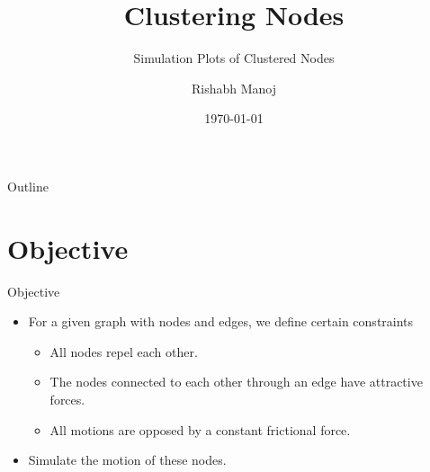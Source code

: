 \documentclass{beamer}
\title{Clustering Nodes}
\subtitle{Simulation Plots of Clustered Nodes}
\author{Rishabh Manoj}
\institute{International Institute of Information Technology Bangalore}
\date{\today}
\begin{document}
\begin{frame}
  \titlepage
\end{frame}

\begin{frame}{Outline}
  \tableofcontents
\end{frame}



\section{Objective}

\begin{frame}{Objective}{}
  \begin{itemize}
  \item For a given graph with nodes and edges, we define certain constraints 
    \begin{itemize}
        \item All nodes repel each other.
        \item The nodes connected to each other through an edge have attractive forces.
        \item All motions are opposed by a constant frictional force.
    \end{itemize}
   \item Simulate the motion of these nodes.
  \end{itemize}
\end{frame}
\end{document}
